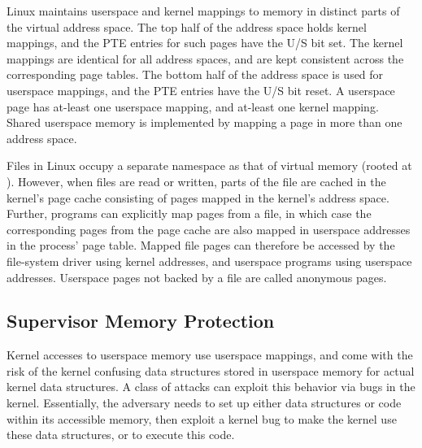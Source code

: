 \documentclass[letterpaper,twocolumn,10pt]{article}
\begin{document}
Linux maintains userspace and kernel mappings to memory in distinct 
parts of the virtual address space. 
The top half of the address space holds kernel mappings, and the 
PTE entries for such pages have the U/S bit set. 
The kernel mappings are identical for all address spaces, and are 
kept consistent across the corresponding page tables.
The bottom half of the address space is used for userspace mappings, 
and the PTE entries have the U/S bit reset.
A userspace page has at-least one userspace mapping, and at-least one
kernel mapping.
Shared userspace memory is implemented by mapping a page in more than 
one address space.

Files in Linux occupy a separate namespace as that of virtual memory
(rooted at \Code{/}).
However, when files are read or written, parts of the file are cached
in the kernel's page cache consisting of pages mapped in the kernel's 
address space.
Further, programs can explicitly map pages from a file, in which case 
the corresponding pages from the page cache are also mapped in userspace 
addresses in the process' page table.
Mapped file pages can therefore be accessed by the file-system driver using 
kernel addresses, and userspace programs using userspace addresses.
Userspace pages not backed by a file are called anonymous pages.


\subsection{Supervisor Memory Protection} %

Kernel accesses to userspace memory use userspace mappings, and 
come with the risk of the kernel confusing data structures 
stored in userspace memory for actual kernel data structures.
A class of attacks can exploit this behavior via bugs in the 
kernel.
Essentially, the adversary needs to set up either data structures
or code within its accessible memory, then exploit a kernel 
bug to make the kernel use these data structures, or to execute 
this code.
\end{document}
